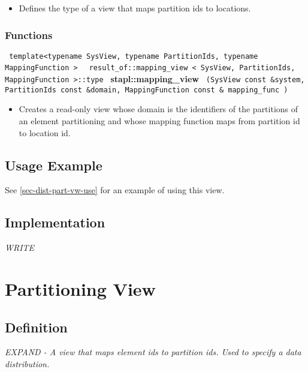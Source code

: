 \begin{itemize}
\item
Defines the type of a view that maps partition ids to locations.
\end{itemize}

\subsubsection{Functions}

\noindent
\texttt{%
template<typename SysView, typename PartitionIds, typename MappingFunction >
}
\texttt{%
result\_of::mapping\_view < SysView, PartitionIds, MappingFunction >::type
}
\newline
\textbf{stapl::mapping\_view}%
\texttt{%
(SysView const \&system, PartitionIds const \&domain,
    MappingFunction const \&
mapping\_func
)
}

\begin{itemize}
\item
Creates a read-only view whose domain is the identifiers of the partitions of an element partitioning and whose mapping function maps from partition id to location id.
\end{itemize}

\subsection{Usage Example} 

See \ref{sec-dist-part-vw-use} for an example of using this view.

\subsection{Implementation} \label{sec-dist-map-vw-impl}

\textit{WRITE}


\section{Partitioning View} \label{sec-dist-part-vw}

\subsection{Definition}

\textit{EXPAND - A view that maps element ids to partition ids.
Used to specify a data distribution.}

